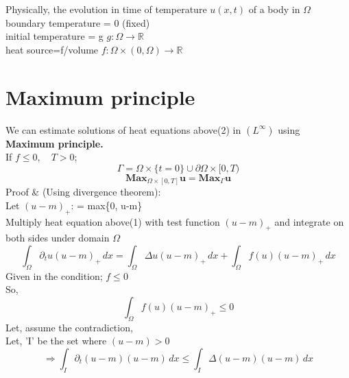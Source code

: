 Physically, the evolution in time of temperature $u(x,t)$ of a body in $\Omega$ \\
boundary temperature = 0 (fixed) \\
initial temperature = g \qquad $g:\Omega \rightarrow \mathbb{R}$\\
heat source=f/volume \qquad $f:\Omega \times (0,\Omega ) \rightarrow \mathbb{R}$ \\

\section{Maximum principle}
We can estimate solutions of heat equations above(2)  in $(L^{\infty})$ using \textbf{ Maximum principle.}\\
If $f \leq 0, \quad T>0 $;\\
\[\Gamma = \Omega \times \{t=0\} \cup \partial \Omega \times [0,T)
\]
\[
\textbf{Max}_{\Omega\times[0,T]} \textbf{u} = \textbf{Max}_{\Gamma} \textbf{u}
\]
Proof & (Using divergence theorem):\\
Let $(u-m)_{+}$: = max\{0, u-m\}\\
Multiply heat equation above(1) with test function $(u-m)_{+}$ and integrate on both sides under domain $\Omega $\\
\[
\int_{\Omega} \partial_{t} u (u-m)_{+} \,dx = \int_{\Omega} \Delta u (u-m)_{+}\,dx + \int_{\Omega} f(u)(u-m)_{+}\,dx
\]
Given in the condition; $f \leq 0$\\
So, \[\int_{\Omega}f(u)(u-m)_{+} \leq 0\]
Let, assume the contradiction,\\
Let, 'I' be the set where $(u-m)>0$\\
\[ \Rightarrow
\int_{I} \partial_{t}(u-m)(u-m)\,dx \leq \int_{I}\Delta (u-m)(u-m)\,dx
\]
\\

